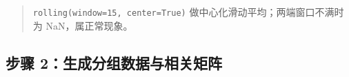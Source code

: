 \begin{Shaded}
\begin{Highlighting}[]
\end{Highlighting}
\end{Shaded}

\begin{quote}
\texttt{rolling(window=15,\ center=True)}
做中心化滑动平均；两端窗口不满时为 NaN，属正常现象。
\end{quote}

\subsection{步骤
2：生成分组数据与相关矩阵}\label{ux6b65ux9aa4-2ux751fux6210ux5206ux7ec4ux6570ux636eux4e0eux76f8ux5173ux77e9ux9635}

